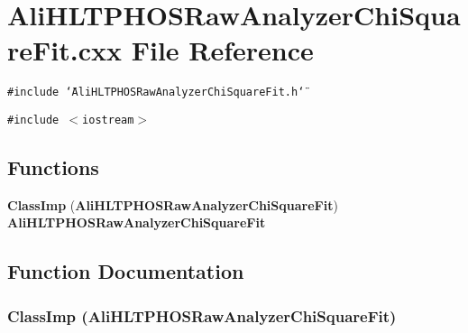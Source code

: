 \section{Ali\-HLTPHOSRaw\-Analyzer\-Chi\-Square\-Fit.cxx File Reference}
\label{AliHLTPHOSRawAnalyzerChiSquareFit_8cxx}
{\tt \#include \char`\"{}Ali\-HLTPHOSRaw\-Analyzer\-Chi\-Square\-Fit.h\char`\"{}}\par
{\tt \#include $<$iostream$>$}\par
\subsection*{Functions}
\begin{CompactItemize}
\item 
{\bf Class\-Imp} ({\bf Ali\-HLTPHOSRaw\-Analyzer\-Chi\-Square\-Fit}) {\bf Ali\-HLTPHOSRaw\-Analyzer\-Chi\-Square\-Fit}
\end{CompactItemize}


\subsection{Function Documentation}
\subsubsection{\setlength{\rightskip}{0pt plus 5cm}Class\-Imp ({\bf Ali\-HLTPHOSRaw\-Analyzer\-Chi\-Square\-Fit})}\label{AliHLTPHOSRawAnalyzerChiSquareFit_8cxx_a0}


